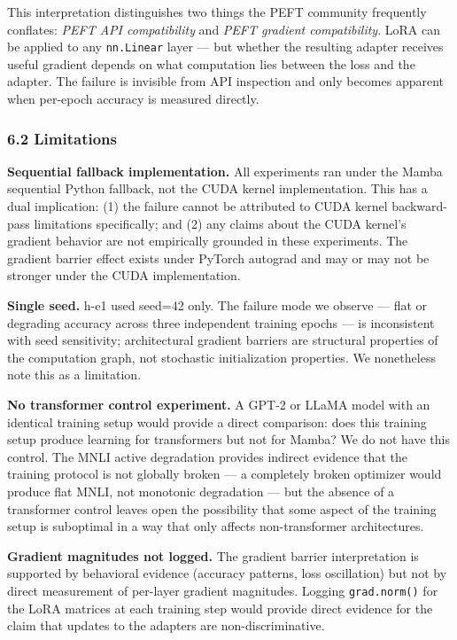 This interpretation distinguishes two things the PEFT community frequently conflates: \textit{PEFT API compatibility} and \textit{PEFT gradient compatibility}. LoRA can be applied to any \texttt{nn.Linear} layer --- but whether the resulting adapter receives useful gradient depends on what computation lies between the loss and the adapter. The failure is invisible from API inspection and only becomes apparent when per-epoch accuracy is measured directly.

\subsubsection{6.2 Limitations}

\textbf{Sequential fallback implementation.} All experiments ran under the Mamba sequential Python fallback, not the CUDA kernel implementation. This has a dual implication: (1) the failure cannot be attributed to CUDA kernel backward-pass limitations specifically; and (2) any claims about the CUDA kernel's gradient behavior are not empirically grounded in these experiments. The gradient barrier effect exists under PyTorch autograd and may or may not be stronger under the CUDA implementation.

\textbf{Single seed.} h-e1 used seed=42 only. The failure mode we observe --- flat or degrading accuracy across three independent training epochs --- is inconsistent with seed sensitivity; architectural gradient barriers are structural properties of the computation graph, not stochastic initialization properties. We nonetheless note this as a limitation.

\textbf{No transformer control experiment.} A GPT-2 or LLaMA model with an identical training setup would provide a direct comparison: does this training setup produce learning for transformers but not for Mamba? We do not have this control. The MNLI active degradation provides indirect evidence that the training protocol is not globally broken --- a completely broken optimizer would produce flat MNLI, not monotonic degradation --- but the absence of a transformer control leaves open the possibility that some aspect of the training setup is suboptimal in a way that only affects non-transformer architectures.

\textbf{Gradient magnitudes not logged.} The gradient barrier interpretation is supported by behavioral evidence (accuracy patterns, loss oscillation) but not by direct measurement of per-layer gradient magnitudes. Logging \texttt{grad.norm()} for the LoRA matrices at each training step would provide direct evidence for the claim that updates to the adapters are non-discriminative.

